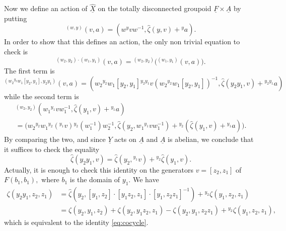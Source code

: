 \documentclass[11pt]{amsart}
\theoremstyle{plain}
\theoremstyle{definition}
\theoremstyle{remark}
\newcommand{\un}{\underline}
\begin{document}
Now we define an action of $\un{\widehat{X}}$ on the totally disconnected groupoid $\un{F} \times \un{A}$ by putting
\[{}^{(w,y)} (v,a) = (w{}^y vw^{-1}, \widehat{\zeta}(y,v) + {}^{y}a).\]
In order to show that this defines an action, the only non trivial equation to check is
\[{}^{(w_2,y_2)\cdot (w_1,y_1)} (v,a) = {}^{(w_2,y_2)} \Big({}^{(w_1,y_1)} (v,a)\Big).\]
The first term is
\[{}^{(w_2{}^{y_2}w_1 [y_2,y_1],y_2y_1)} (v,a) = (w_2{}^{y_2}w_1 [y_2,y_1]  {}^{y_2y_1}v (w_2{}^{y_2}w_1 [y_2,y_1])^{-1} , \widehat{\zeta} (y_2y_1,v) + {}^{y_2y_1}a)\]
while the second term is
\begin{gather*}
	{}^{(w_2,y_2)} (w_1{}^{y_1}v w_1^{-1}, \widehat{\zeta}(y_1,v) + {}^{y_1}a) \\
	= \big(w_2 {}^{y_2} w_1 {}^{y_2}({}^{y_1}v) {}^{y_2}(w_1^{-1}) w_2^{-1} , \widehat{\zeta} (y_2, w_1{}^{y_1}v w_1^{-1} ) +{}^{y_2} (\widehat{\zeta}(y_1,v) + {}^{y_1}a)\big).
\end{gather*}
By comparing the two, and since $\un{Y}$ acts on $\un{A}$ and $\un{A}$ is abelian, we conclude that it suffices to check the equality
\[\widehat{\zeta} (y_2y_1,v) = \widehat{\zeta} (y_2,{}^{y_1}v) + {}^{y_2}\widehat{\zeta} (y_1,v).\]
Actually, it is enough to check this identity on the generators $v=[z_2,z_1]$ of $F(b_1,b_1),$ where $b_1$ is the domain of $y_1.$ We have
\begin{align*}
	\zeta(y_2y_1,z_2,z_1) & = \widehat{\zeta}(y_2,[y_1,z_2] \cdot [y_1z_2,z_1] \cdot [y_1,z_2z_1]^{-1}) + {}^{y_2} \zeta(y_1,z_2,z_1)\\
	& = \zeta(y_2,y_1,z_2) + \zeta(y_2,y_1z_2,z_1) - \zeta (y_2,y_1,z_2z_1) + {}^{y_2} \zeta(y_1,z_2,z_1),
\end{align*}
which is equivalent to the identity \eqref{eq:cocycle}.
\end{document}
